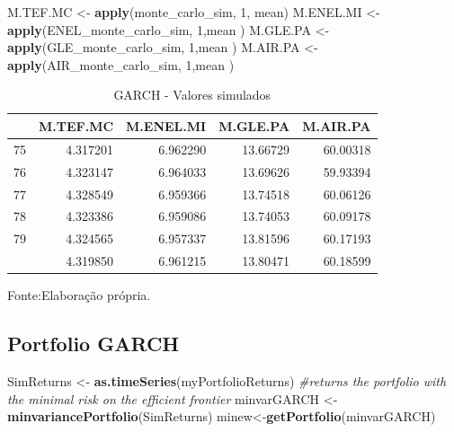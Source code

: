 \documentclass[
  12pt,
  a4paper,
  openany]{book}
\newenvironment{Shaded}{\begin{snugshade}}{\end{snugshade}}
\newcommand{\CommentTok}[1]{\textcolor[rgb]{0.56,0.35,0.01}{\textit{#1}}}
\newcommand{\DecValTok}[1]{\textcolor[rgb]{0.00,0.00,0.81}{#1}}
\newcommand{\KeywordTok}[1]{\textcolor[rgb]{0.13,0.29,0.53}{\textbf{#1}}}
\newcommand{\NormalTok}[1]{#1}
\newcommand{\StringTok}[1]{\textcolor[rgb]{0.31,0.60,0.02}{#1}}
\begin{document}
\scriptsize

\begin{Shaded}
\begin{Highlighting}[]
\NormalTok{M.TEF.MC \textless{}{-}}\StringTok{ }\KeywordTok{apply}\NormalTok{(monte\_carlo\_sim, }\DecValTok{1}\NormalTok{, mean)}
\NormalTok{M.ENEL.MI \textless{}{-}}\StringTok{ }\KeywordTok{apply}\NormalTok{(ENEL\_monte\_carlo\_sim, }\DecValTok{1}\NormalTok{,mean )}
\NormalTok{M.GLE.PA \textless{}{-}}\StringTok{ }\KeywordTok{apply}\NormalTok{(GLE\_monte\_carlo\_sim, }\DecValTok{1}\NormalTok{,mean )}
\NormalTok{M.AIR.PA \textless{}{-}}\StringTok{ }\KeywordTok{apply}\NormalTok{(AIR\_monte\_carlo\_sim, }\DecValTok{1}\NormalTok{,mean )}
\end{Highlighting}
\end{Shaded}

\normalsize
\begin{table}[!h]

\caption{\label{tab:unnamed-chunk-40}GARCH - Valores simulados}
\centering
\begin{tabular}[t]{lrrrr}
\toprule
  & M.TEF.MC & M.ENEL.MI & M.GLE.PA & M.AIR.PA\\
\midrule
75 & 4.317201 & 6.962290 & 13.66729 & 60.00318\\
76 & 4.323147 & 6.964033 & 13.69626 & 59.93394\\
77 & 4.328549 & 6.959366 & 13.74518 & 60.06126\\
78 & 4.323386 & 6.959086 & 13.74053 & 60.09178\\
79 & 4.324565 & 6.957337 & 13.81596 & 60.17193\\
\addlinespace
80 & 4.319850 & 6.961215 & 13.80471 & 60.18599\\
\bottomrule
\end{tabular}
\end{table}
\FloatBarrier
\centering

Fonte:Elaboração própria.

\justifying
\bigskip

\hypertarget{portfolio-garch}{%
\subsection{Portfolio GARCH}\label{portfolio-garch}}

\scriptsize

\begin{Shaded}
\begin{Highlighting}[]
\NormalTok{SimReturns \textless{}{-}}\StringTok{ }\KeywordTok{as.timeSeries}\NormalTok{(myPortfolioReturns)}
\CommentTok{\#returns the portfolio with the minimal risk on the efficient frontier}
\NormalTok{minvarGARCH \textless{}{-}}\StringTok{ }\KeywordTok{minvariancePortfolio}\NormalTok{(SimReturns) }
\NormalTok{minew\textless{}{-}}\KeywordTok{getPortfolio}\NormalTok{(minvarGARCH)}
\end{Highlighting}
\end{Shaded}
\end{document}

